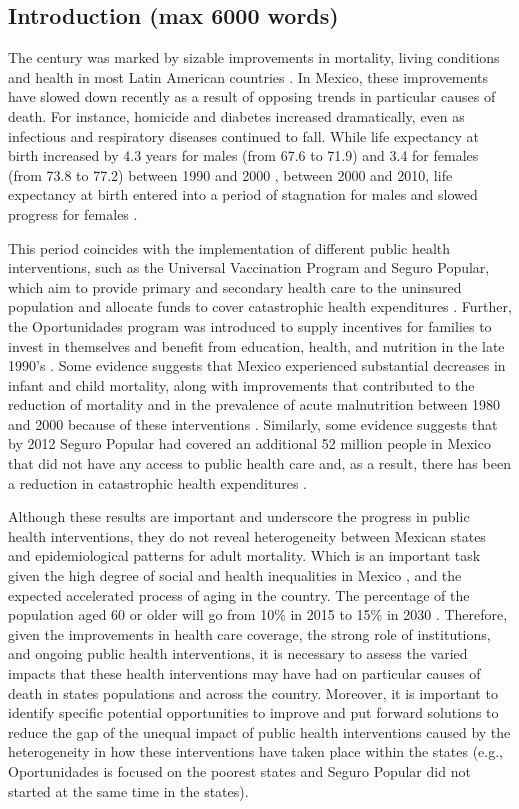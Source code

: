 \documentclass{article}
\begin{document}
\begin{spacing}{1.5}
\section*{Introduction (max 6000 words)}
The  century was marked by sizable improvements in mortality, living
conditions and health in most Latin American countries \citep{who2000}. 
In Mexico, these improvements have slowed down recently as a result of opposing
trends in particular causes of death. For instance, homicide and diabetes
increased dramatically, even as infectious and
respiratory diseases continued to fall. While life
expectancy at birth increased by 4.3 years for males (from 67.6 to 71.9) and 3.4
for females (from 73.8 to 77.2) between 1990 and 2000 \citep{SOMEDE},
between 2000 and 2010, life expectancy at birth entered into a period of
stagnation for males and slowed progress for females \citep{canudas2014}. 


This
period coincides with the implementation of different public health
interventions, such as the Universal Vaccination Program and Seguro
Popular, which aim to provide primary and secondary
health care to the uninsured population and allocate funds to cover catastrophic
health expenditures \citep{knaul2005}. Further, the Oportunidades program
was introduced to supply incentives for families to invest in themselves and
benefit from education, health, and nutrition in the late 1990's \citep{neufeld2012}. Some evidence
suggests that Mexico experienced substantial decreases in infant and child
mortality, along with improvements that contributed to the reduction of
mortality and in the prevalence of acute malnutrition between 1980 and 2000
because of these interventions \citep{sepulveda2006}. Similarly, some evidence
suggests that by 2012 Seguro Popular had covered an additional 52 million
people in Mexico that did not have any access to public health care and, as a result, there has been a reduction in catastrophic health expenditures \citep{knaul2012}.

 Although these results are important and underscore the progress in public health interventions,  they do not reveal heterogeneity between
 Mexican states and epidemiological patterns for adult mortality.  Which is an important task given the high degree of social and health inequalities in Mexico \citep{Frenk2006}, and the expected accelerated process of aging in the country.   The percentage of the population aged 60 or older will go from 10\% in 2015 to 15\% in 2030 \citep{CONAPO}. Therefore,  given the improvements
 in health care coverage, the strong role of institutions, and ongoing public
 health interventions, it is necessary to assess the varied impacts that
 these health interventions may have had on particular causes of death in states
 populations and across the country. Moreover, it is important to identify specific potential opportunities to improve and put forward solutions to reduce the gap of  the unequal impact of public health interventions caused by the heterogeneity in how these interventions have taken place within the states (e.g., Oportunidades is focused on the poorest states and Seguro Popular did not started at the same time in the states).  
 

\end{spacing}
\end{document}

